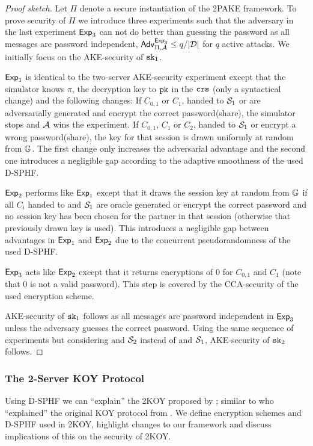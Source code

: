 \begin{proof}[Proof sketch]
Let $\Pi$ denote a secure instantiation of the \ac{2PAKE} framework.
To prove security of $\Pi$ we introduce three experiments such that the adversary in the last experiment $\mathsf{Exp}_3$ can not do better than guessing the password as all messages are password independent, \ie $\mathsf{Adv}_{\Pi,\mathcal{A}}^{\mathsf{Exp}_3}\leq q/|\mathcal{D}|$ for $q$ active attacks.
We initially focus on the \ac{AKE}-security of $\mathtt{sk}_1$.

$\mathsf{Exp}_1$ is identical to the two-server \ac{AKE}-security experiment except that the simulator knows $\pi$, the decryption key to $\mathtt{pk}$ in the $\mathtt{crs}$ (only a syntactical change) and the following changes:
If $C_{0,1}$ or $C_{1}$, handed to $\mathcal{S}_1$ or \Client are adversarially generated and encrypt the correct password(share), the simulator stops and $\mathcal{A}$ wins the experiment.
If $C_{0,1}$, $C_1$ or $C_2$, handed to $\mathcal{S}_1$ or \Client encrypt a wrong password(share), the key for that session is drawn uniformly at random from $\mathbb{G}$.
The first change only increases the adversarial advantage and the second one introduces a negligible gap according to the adaptive smoothness of the used \ac{D-SPHF}.

$\mathsf{Exp}_2$ performs like $\mathsf{Exp}_1$ except that it draws the session key at random from $\mathbb{G}$ if all $C_i$ handed to \Client and $\mathcal{S}_1$ are oracle generated or encrypt the correct password and no session key has been chosen for the partner in that session (otherwise that previously drawn key is used).
This introduces a negligible gap between advantages in $\mathsf{Exp}_1$ and $\mathsf{Exp}_2$ due to the concurrent pseudorandomness of the used \ac{D-SPHF}.

$\mathsf{Exp}_3$ acts like $\mathsf{Exp}_2$ except that it returns encryptions of $0$ for $C_{0,1}$ and $C_1$ (note that $0$ is not a valid password).
This step is covered by the \ac{CCA}-security of the used encryption scheme.

\ac{AKE}-security of $\mathtt{sk}_1$ follows as all messages are password independent in $\mathsf{Exp}_3$ unless the adversary guesses the correct password.
Using the same sequence of experiments but considering \Client and $\mathcal{S}_2$ instead of \Client and $\mathcal{S}_1$, \ac{AKE}-security of $\mathtt{sk}_2$ follows.
\end{proof}

\subsubsection{The 2-Server KOY Protocol}\label{sec:twokoy}
Using \ac{D-SPHF} we can ``explain'' the 2KOY proposed by \citet{Katz2012a}; similar to \citet{Gennaro2003} who ``explained'' the original KOY protocol from \citet{KatzOY01}.
We define encryption schemes and \ac{D-SPHF} used in 2KOY, highlight changes to our framework and discuss implications of this on the security of 2KOY.

